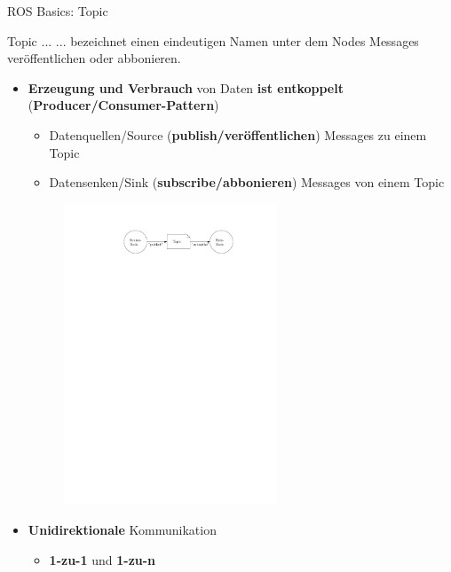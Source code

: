 \documentclass{beamer}
\begin{document}
\begin{frame}{ROS Basics: Topic}
\begin{alertblock}{Topic ...}
... bezeichnet einen eindeutigen Namen unter dem Nodes Messages ver\"offentlichen oder abbonieren.
\end{alertblock}
\begin{itemize}
	\item \textbf{Erzeugung und Verbrauch} von Daten \textbf{ist entkoppelt} (\textbf{Producer/Consumer-Pattern})
	\begin{itemize}
		\item Datenquellen/Source (\textbf{publish/ver\"offentlichen}) Messages zu einem Topic
		\item Datensenken/Sink (\textbf{subscribe/abbonieren}) Messages von einem Topic
	\end{itemize}
	\begin{figure}[H]
		\centering
		\includegraphics[width=0.6\textwidth]{./images/ros-topic.pdf}
		\label{fig:ros_topic}
	\end{figure}
	\item \textbf{Unidirektionale} Kommunikation
	\begin{itemize}
		\item \textbf{1-zu-1} und \textbf{1-zu-n}
	\end{itemize}
\end{itemize}
\end{frame}
\end{document}
